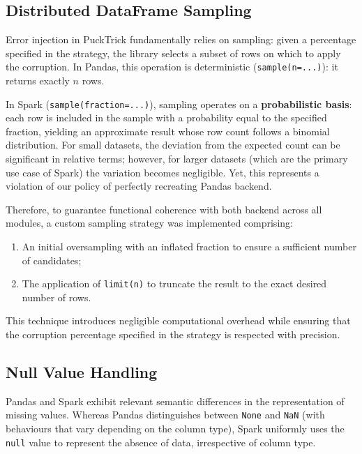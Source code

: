 \documentclass[../main.tex]{subfiles}
\begin{document}
\newpage
\subsection{Distributed DataFrame Sampling}
\label{sec:sampling}

Error injection in PuckTrick fundamentally relies on sampling: given a percentage 
specified in the strategy, the library selects a subset of rows on which to apply the 
corruption. In Pandas, this operation is deterministic (\texttt{sample(n=...)}): it 
returns exactly $n$ rows.

In Spark (\texttt{sample(fraction=...)}), sampling operates on a \textbf{probabilistic basis}: 
each row is included in the sample with a probability equal to the specified fraction, 
yielding an approximate result whose row count follows a binomial distribution. For 
small datasets, the deviation from the expected count can be significant in relative 
terms; however, for larger datasets (which are the primary use case of Spark) the variation 
becomes negligible. Yet, this represents a violation of our policy of perfectly recreating Pandas backend.

Therefore, to guarantee functional coherence with both backend across all modules, a custom 
sampling strategy was implemented comprising:

\begin{enumerate}
    \item An initial oversampling with an inflated fraction to ensure a sufficient number 
          of candidates;
    \item The application of \texttt{limit(n)} to truncate the result to the exact 
          desired number of rows.
\end{enumerate}

This technique introduces negligible computational overhead while ensuring that the 
corruption percentage specified in the strategy is respected with precision.

\subsection{Null Value Handling}
\label{sec:nulls}

Pandas and Spark exhibit relevant semantic differences in the representation of missing 
values. Whereas Pandas distinguishes between \texttt{None} and \texttt{NaN} (with 
behaviours that vary depending on the column type), Spark uniformly uses the 
\texttt{null} value to represent the absence of data, irrespective of column type.
\end{document}
